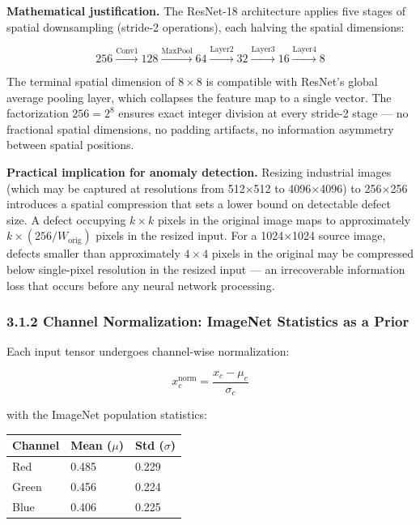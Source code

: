 \documentclass[12pt, a4paper, oneside]{report}
\begin{document}
\textbf{Mathematical justification.} The ResNet-18 architecture applies five stages of spatial downsampling (stride-2 operations), each halving the spatial dimensions:

\[256 \xrightarrow{\text{Conv1}} 128 \xrightarrow{\text{MaxPool}} 64 \xrightarrow{\text{Layer2}} 32 \xrightarrow{\text{Layer3}} 16 \xrightarrow{\text{Layer4}} 8\]

The terminal spatial dimension of \(8 \times 8\) is compatible with ResNet's global average pooling layer, which collapses the feature map to a single vector. The factorization \(256 = 2^8\) ensures exact integer division at every stride-2 stage --- no fractional spatial dimensions, no padding artifacts, no information asymmetry between spatial positions.

\textbf{Practical implication for anomaly detection.} Resizing industrial images (which may be captured at resolutions from 512$\times$512 to 4096$\times$4096) to 256$\times$256 introduces a spatial compression that sets a lower bound on detectable defect size. A defect occupying \(k \times k\) pixels in the original image maps to approximately \(k \times (256/W_{\text{orig}})\) pixels in the resized input. For a 1024$\times$1024 source image, defects smaller than approximately \(4 \times 4\) pixels in the original may be compressed below single-pixel resolution in the resized input --- an irrecoverable information loss that occurs before any neural network processing.

\subsubsection{3.1.2 Channel Normalization: ImageNet Statistics as a Prior}\label{channel-normalization-imagenet-statistics-as-a-prior}

Each input tensor undergoes channel-wise normalization:

\[x_c^{\text{norm}} = \frac{x_c - \mu_c}{\sigma_c}\]

with the ImageNet population statistics:

{\def\LTcaptype{none} %
\begin{longtable}[]{@{}lll@{}}
\toprule\noalign{}
Channel & Mean (\(\mu\)) & Std (\(\sigma\)) \\
\midrule\noalign{}
\endhead
\bottomrule\noalign{}
\endlastfoot
Red & 0.485 & 0.229 \\
Green & 0.456 & 0.224 \\
Blue & 0.406 & 0.225 \\
\end{longtable}
}
\end{document}
